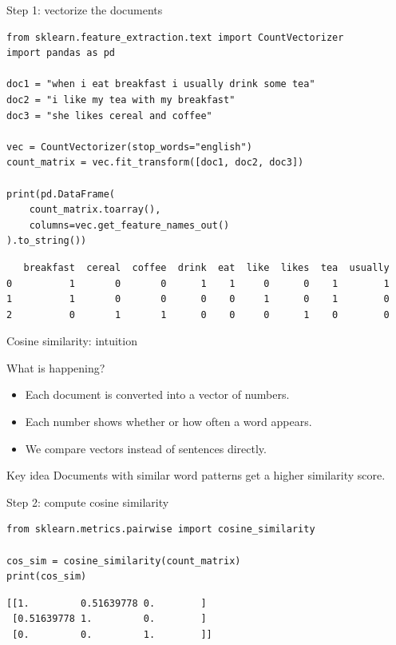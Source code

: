 \documentclass[compress]{beamer}
\begin{document}
\begin{frame}[fragile]{Step 1: vectorize the documents}
\begin{verbatim}
from sklearn.feature_extraction.text import CountVectorizer
import pandas as pd

doc1 = "when i eat breakfast i usually drink some tea"
doc2 = "i like my tea with my breakfast"
doc3 = "she likes cereal and coffee"

vec = CountVectorizer(stop_words="english")
count_matrix = vec.fit_transform([doc1, doc2, doc3])

print(pd.DataFrame(
    count_matrix.toarray(),
    columns=vec.get_feature_names_out()
).to_string())
\end{verbatim}
\pause
\begin{verbatim}
   breakfast  cereal  coffee  drink  eat  like  likes  tea  usually
0          1       0       0      1    1     0      0    1        1
1          1       0       0      0    0     1      0    1        0
2          0       1       1      0    0     0      1    0        0
\end{verbatim}
\end{frame}

\begin{frame}{Cosine similarity: intuition}
  \begin{block}{What is happening?}
    \begin{itemize}[<+>]
      \item Each document is converted into a vector of numbers.
      \item Each number shows whether or how often a word appears.
      \item We compare vectors instead of sentences directly.
    \end{itemize}
  \end{block}
  \pause
  \begin{exampleblock}{Key idea}
    Documents with similar word patterns get a higher similarity score.
  \end{exampleblock}
\end{frame}

\begin{frame}[fragile]{Step 2: compute cosine similarity}
\begin{verbatim}
from sklearn.metrics.pairwise import cosine_similarity

cos_sim = cosine_similarity(count_matrix)
print(cos_sim)
\end{verbatim}
\pause
\begin{verbatim}
[[1.         0.51639778 0.        ]
 [0.51639778 1.         0.        ]
 [0.         0.         1.        ]]
\end{verbatim}
\end{frame}
\end{document}

